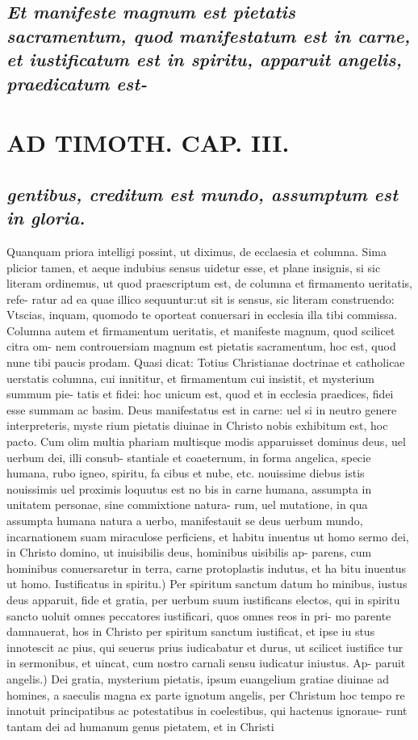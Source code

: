 \documentclass{article}
\begin{document}
\begin{pages}
\subsection*{\textit{Et manifeste magnum est pietatis sacramentum, quod manifestatum est in carne, et iustificatum est in spiritu, apparuit angelis, praedicatum est- }}
\section*{AD TIMOTH. CAP. III. }
\marginpar{[ p.503 ]}
{}
\subsection*{\textit{gentibus, creditum est mundo, assumptum est in gloria. }}\pstart Quanquam priora intelligi possint, ut diximus, de ecclaesia et columna. Sima plicior tamen, et aeque indubius sensus uidetur esse, et plane insignis, si sic literam ordinemus, ut quod praescriptum est, de columna et firmamento ueritatis, refe- ratur ad ea quae illico sequuntur:ut sit is sensus, sic literam construendo: Vtscias, inquam, quomodo te oporteat conuersari in ecclesia illa tibi commissa. Columna autem et firmamentum ueritatis, et manifeste magnum, quod scilicet citra om- nem controuersiam magnum est pietatis sacramentum, hoc est, quod nune tibi paucis prodam. Quasi dicat: Totius Christianae doctrinae et catholicae uerstatis columna, cui innititur, et firmamentum cui insistit, et mysterium summum pie- tatis et fidei: hoc unicum est, quod et in ecclesia praedices, fidei esse summam ac basim. Deus manifestatus est in carne: uel si in neutro genere interpreteris, myste rium pietatis diuinae in Christo nobis exhibitum est, hoc pacto. Cum olim multia phariam multisque modis apparuisset dominus deus, uel uerbum dei, illi consub- stantiale et coaeternum, in forma angelica, specie humana, rubo igneo, spiritu, fa cibus et nube, etc. nouissime diebus istis nouissimis uel proximis loquutus est no bis in carne humana, assumpta in unitatem personae, sine commixtione natura- rum, uel mutatione, in qua assumpta humana natura a uerbo, manifestauit se deus uerbum mundo, incarnationem suam miraculose perficiens, et habitu inuentus ut homo sermo dei, in Christo domino, ut inuisibilis deus, hominibus uisibilis ap- parens, cum hominibus conuersaretur in terra, carne protoplastis indutus, et ha bitu inuentus ut homo. Iustificatus in spiritu.) Per spiritum sanctum datum ho minibus, iustus deus apparuit, fide et gratia, per uerbum suum iustificans electos, qui in spiritu sancto uoluit omnes peccatores iustificari, quos omnes reos in pri- mo parente damnauerat, hos in Christo per spiritum sanctum iustificat, et ipse iu stus innotescit ac pius, qui seuerus prius iudicabatur et durus, ut scilicet iustifice tur in sermonibus, et uincat, cum nostro carnali sensu iudicatur iniustus. Ap- paruit angelis.) Dei gratia, mysterium pietatis, ipsum euangelium gratiae diuinae ad homines, a saeculis magna ex parte ignotum angelis, per Christum hoc tempo re innotuit principatibus ac potestatibus in coelestibus, qui hactenus ignoraue- runt tantam dei ad humanum genus pietatem, et in Christi 
\end{pages}
\end{document}
